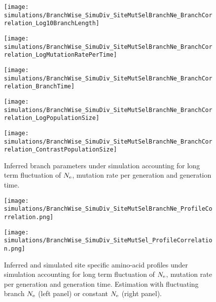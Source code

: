 \begin{figure}[H]
    \centering
    \begin{minipage}{0.32\linewidth}
        \texttt{[image: simulations/BranchWise\_SimuDiv\_SiteMutSelBranchNe\_BranchCorrelation\_Log10BranchLength]}
    \end{minipage}    \hfill
    \begin{minipage}{0.32\linewidth}
        \texttt{[image: simulations/BranchWise\_SimuDiv\_SiteMutSelBranchNe\_BranchCorrelation\_LogMutationRatePerTime]}
    \end{minipage}    \hfill
    \begin{minipage}{0.32\linewidth}
        \texttt{[image: simulations/BranchWise\_SimuDiv\_SiteMutSelBranchNe\_BranchCorrelation\_BranchTime]}
    \end{minipage}    \hfill
    \begin{minipage}{0.32\linewidth}
        \texttt{[image: simulations/BranchWise\_SimuDiv\_SiteMutSelBranchNe\_BranchCorrelation\_LogPopulationSize]}
    \end{minipage}
    \begin{minipage}{0.32\linewidth}
        \texttt{[image: simulations/BranchWise\_SimuDiv\_SiteMutSelBranchNe\_BranchCorrelation\_ContrastPopulationSize]}
    \end{minipage} \hfill
    \caption[Inferred branch parameters for SimuDiv]{
    Inferred branch parameters under simulation accounting for long term fluctuation of $N_{\mathrm{e}}$, mutation rate per generation and generation time.
    }
\end{figure}


\begin{figure}[H]
    \centering
    \begin{minipage}{0.49\linewidth}
        \texttt{[image: simulations/BranchWise\_SimuDiv\_SiteMutSelBranchNe\_ProfileCorrelation.png]}
    \end{minipage}    \hfill
    \begin{minipage}{0.49\linewidth}
        \texttt{[image: simulations/BranchWise\_SimuDiv\_SiteMutSel\_ProfileCorrelation.png]}
    \end{minipage}
    \caption[Inferred site amino-acid profiles for SimuDiv]{
    Inferred and simulated site specific amino-acid profiles under simulation accounting for long term fluctuation of $N_{\mathrm{e}}$, mutation rate per generation and generation time.
    Estimation with fluctuating branch $N_{\mathrm{e}}$ (left panel) or constant $N_{\mathrm{e}}$ (right panel).}
\end{figure}

